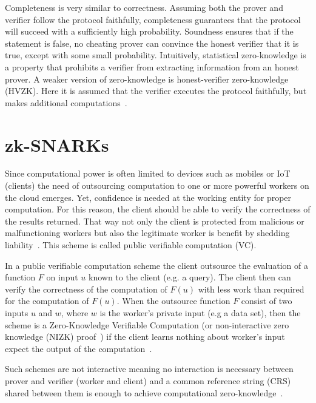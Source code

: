 Completeness is very similar to correctness. Assuming both the prover and verifier follow the protocol faithfully, completeness guarantees that the
protocol will succeed with a sufficiently high probability.
Soundness ensures that if the statement is false, no cheating prover can convince the honest verifier that it is true, except with some small probability.
Intuitively, statistical zero-knowledge is a property that prohibits a verifier from extracting information from an honest prover.
A weaker version of zero-knowledge is honest-verifier zero-knowledge (HVZK). Here it is assumed that the verifier executes the protocol faithfully,
but makes additional computations~\cite{kiagias:crypto}.

\section{zk-SNARKs}
\label{zkp:snarks}

Since computational power is often limited to devices such as mobiles or IoT (clients) the need of outsourcing computation to one or more powerful workers on the cloud emerges. Yet, confidence is needed at the working entity for proper computation. For this reason, the client should be able to verify the correctness of the results returned. That way not only the client is protected from malicious or malfunctioning workers but also the legitimate worker is benefit by shedding liability~\cite{pinocchio-nearly-practical-verifiable-computation}. This scheme is called public verifiable computation (VC).

In a public verifiable computation scheme the client outsource the evaluation of a function $F$ on input $u$ known to the client (e.g. a query). The client then can verify the correctness of the computation of $F(u)$ with less work than required for the computation of $F(u)$. When the outsource function $F$ consist of two inputs $u$ and $w$, where $w$ is the worker's private input (e.g a data set), then the scheme is a Zero-Knowledge Verifiable Computation (or non-interactive zero knowledge (NIZK) proof~\cite{Blum:1991:NZ:123137.123145}) if the client learns nothing about worker's input expect the output of the computation~\cite{pinocchio-nearly-practical-verifiable-computation}.

Such schemes are not interactive meaning no interaction is necessary between prover and verifier (worker and client) and a common reference string (CRS) shared between them is enough to achieve computational zero-knowledge~\cite{Blum:1991:NZ:123137.123145}.

